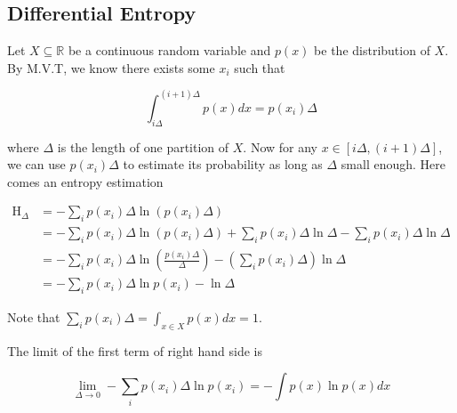 \documentclass{article}
\begin{document}
            

            
        \subsection{Differential Entropy}

            Let $ X \subseteq \mathbb{R} $ be a continuous random variable and
            $ p(x) $ be the distribution of $ X $. By M.V.T, we know there
            exists some $ x_{i} $ such that

            \begin{equation*}
                 \int_{i \Delta}^{ (i+1) \Delta } p(x) dx = p(x_{i}) \Delta
            \end{equation*}

            where $ \Delta $ is the length of one partition of $ X $. Now for any
            $ x \in [i \Delta, (i + 1) \Delta] $, we can use $ p(x_i) \Delta $ to estimate
            its probability as long as $ \Delta $ small enough. Here comes an
            entropy estimation

            \begin{align*}
                \operatorname{H}_{\Delta}
                      &= - \sum_i p(x_i) \Delta \ln( p(x_i) \Delta) \\
                      &= - \sum_i p(x_i) \Delta \ln(p(x_i) \Delta) +
                             \sum_i p(x_i) \Delta \ln \Delta -
                                 \sum_i p(x_i) \Delta \ln \Delta    \\
                      &= - \sum_i p(x_i) \Delta \ln \left(
                                \frac{p(x_i) \Delta}{\Delta}
                            \right) - \left(
                                \sum_i p(x_i) \Delta
                            \right) \ln \Delta                      \\
                      &= - \sum_i p(x_i) \Delta \ln p(x_i) - \ln \Delta
            \end{align*}

            Note that $ \sum_i p(x_i) \Delta = \int_{x \in X} p(x) dx = 1 $.

            The limit of the first term of right hand side is

            \begin{equation*}
                 \lim_{\Delta \rightarrow 0} - \sum_i p(x_i) \Delta \ln p(x_i)
                 = - \int p(x) \ln p(x) dx
            \end{equation*}
\end{document}
